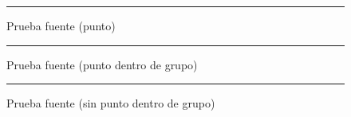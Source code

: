 \documentclass{sener2025}
\begin{document}
\begin{figure}[H]
\centering
\rule{4cm}{2cm}
\caption{Prueba fuente (punto)}
\end{figure}

\begin{figure}[H]
\centering
\rule{4cm}{2cm}
\caption{Prueba fuente (punto dentro de grupo)}
\end{figure}

\begin{figure}[H]
\centering
\rule{4cm}{2cm}
\caption{Prueba fuente (sin punto dentro de grupo)}
\end{figure}
\end{document}
